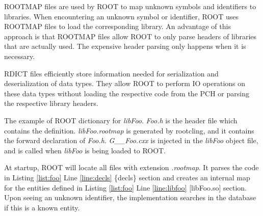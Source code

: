 \documentclass{webofc}
\begin{document}
ROOTMAP files are used by ROOT to map unknown symbols and identifiers to libraries. When encountering an unknown symbol or identifier, ROOT uses ROOTMAP files to load the corresponding library. An advantage of this approach is that ROOTMAP files allow ROOT to only parse headers of libraries that are actually used. The expensive header parsing only happens when it is necessary.

RDICT files efficiently store information needed for serialization and deserialization of data types. They allow ROOT to perform IO operations on these data types without loading the respective code from the PCH or parsing the respective library headers.

\begin{listing}[h]
    \noindent
    \begin{minipage}[h]{\textwidth}
    \begin{cppcode*}{}
// Foo.h
    |\label{line:foobar}|namespace foo { struct bar{}; }
    |\label{line:structs}|struct S{};

// libFoo.rootmap
    |\label{line:decls}|{ decls }
    namespace foo { }
    struct S;
 
    |\label{line:libfoo}|[ libFoo.so ]
    # List of selected classes
    class bar
    struct S

// G__Foo.cxx (aka libFoo dictionary)
    namespace {
      void TriggerDictionaryInitialization_libFoo_Impl() {
        static const char* headers[] = {"Foo.h"}
        // More scaffolding
        extern int __Cling_Autoloading_Map;
        namespace foo{struct __attribute__((annotate("$ClingAutoload$Foo.h"))) bar;}
        struct __attribute__((annotate("$ClingAutoload$Foo.h"))) S;
       // More initialization scaffolding.
    }
    \end{cppcode*}
    \end{minipage}
    \caption{The example of ROOT dictionary for {\it libFoo}. {\it Foo.h} is the header file which contains the definition. {\it libFoo.rootmap} is generated by rootcling, and it contains the forward declaration of {\it Foo.h}. {\it G\_\_Foo.cxx} is injected in the {\it libFoo} object file, and is called when {\it libFoo} is being loaded to ROOT.}
    \label{list:foo}
\end{listing}

At startup, ROOT will locate all files with extension {\it *.rootmap}. It parses the code in Listing \ref{list:foo} Line \ref{line:decls} \{decls\} section and creates an internal map for the entities defined in Listing \ref{list:foo} Line \ref{line:libfoo} [libFoo.so] section. Upon seeing an unknown identifier, the implementation searches in the database if this is a known entity.
\end{document}
